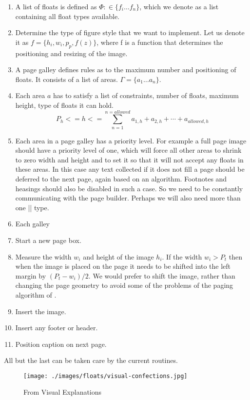 \begin{enumerate}
\item  A list of floats is defined as $\Phi \colon \in \{f_i\dots f_n \}$, which we denote as a list containing all float types available. 
\item Determine the type of figure style that we want to implement. Let us denote it as 
         $f = \{h_i,w_i,p_p, f(z)\}$, where f is a function that determines the positioning and resizing of the image.
\item A page galley defines rules as to the maximum number and positioning of floats. It consists of a list
      of areas.
      $\Gamma = \{a_1\dots a_n\} $.
\item Each area $a$ has to satisfy a list of constraints, number of floats, maximum height, type of floats it can hold.
      \[ P_h <= h <= \sum_{n=1}^{n=allowed} a_{1,h} + a_{2,h}+\cdots+ a_{allowed,h} \]  
\item Each area in a page galley has a priority level. For example a full page image should have a priority level of one, which will force all other areas to shrink to zero width and height and to set it so that it will not accept any floats in these areas. In this case any text collected if it does not fill a page should be deferred to the next page, again based on an algorithm. Footnotes and heasings should also be disabled in such a case. So we need to be constantly communicating with the page builder. Perhaps we will also need more than one |\clearpage| type.       
\item Each galley                   
\item Start a new page box.
\item Measure the width $w_i$  and height of the image $h_i$. If the width $w_i>P_t$ then when the image is placed on the page it needs to be shifted into the left margin by $(P_t-w_i)/2$. We would prefer to shift the image, rather than changing the page geometry to avoid some of the problems of the paging algorithm of \tex. 
\item Insert the image.
\item Insert any footer or header. 
\item Position caption on next page.          
\end{enumerate}

All but the last can be taken care by the current \latexe routines. 

\begin{figure}[htbp]
\texttt{[image: ./images/floats/visual-confections.jpg]}
\caption{From Visual Explanations}
\end{figure}


